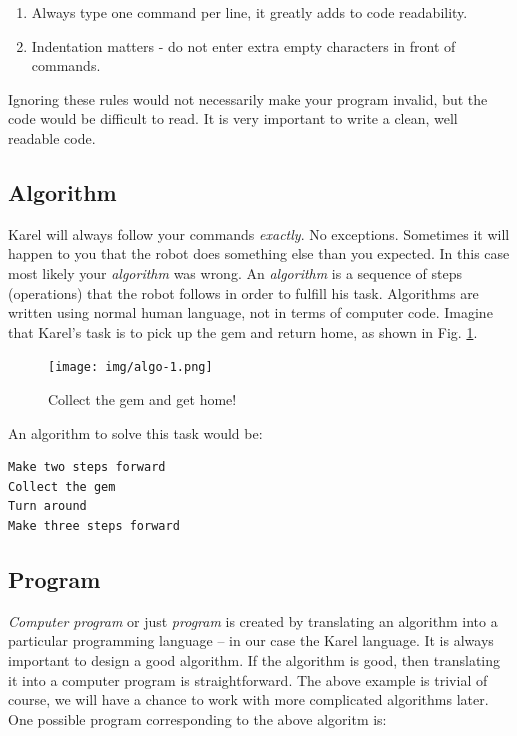 \begin{gbox}
\begin{enumerate}
\item Always type one command per line, it greatly adds to code readability.
\item Indentation matters - do not enter extra empty characters in front of commands. 
\end{enumerate}
\end{gbox}
\vspace{6mm}

\noindent
Ignoring these rules would not necessarily make your program invalid, 
but the code would be difficult to read. It is very important to write 
a clean, well readable code. 

\subsection{Algorithm} \label{subsec:interm1}

Karel will always follow your commands {\em exactly}. No exceptions. Sometimes it will happen
to you that the robot does something else than you expected.
In this case most likely your {\em algorithm} was wrong. An {\em algorithm} is a sequence of 
steps (operations) that the robot follows in order to fulfill his task. Algorithms 
are written using normal human language, not in terms of computer code. Imagine that Karel's 
task is to pick up the gem and return home, as shown in Fig. \ref{fig:algo-1}.

\begin{figure}[!ht]
\begin{center}
\texttt{[image: img/algo-1.png]}
\vspace{-0mm}
\caption{Collect the gem and get home!}
\label{fig:algo-1}
\vspace{-1.5cm}
\end{center}
\end{figure}
\newpage
\noindent
An algorithm to solve this task would be:

\begin{verbatim}
Make two steps forward
Collect the gem
Turn around
Make three steps forward
\end{verbatim}

\subsection{Program}

{\em Computer program} or just {\em program} is created by translating an algorithm into a particular 
programming language -- in our case the Karel language. It is always important 
to design a good algorithm. If the algorithm is good, then translating it 
into a computer program is straightforward. The above example is trivial of
course, we will have a chance to work with more complicated algorithms later. 
One possible program corresponding to the above algoritm is:\\

